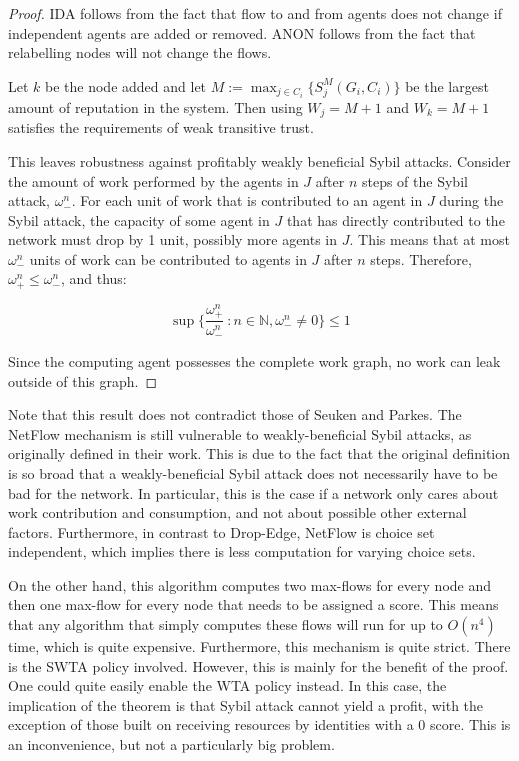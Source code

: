 \documentclass[a4paper,11pt]{book}
\newcommand{\bb}{\mathbb}
\theoremstyle{definition}
\begin{document}
\begin{proof}
    IDA follows from the fact that flow to and from agents does not change if independent agents
    are added or removed. ANON follows from the fact that relabelling nodes will not change the flows.

    Let $k$ be the node added and let 
    $M := \max_{j \in C_i}\{S^M_j(G_i, C_i)\}$ be the largest amount of reputation in the system.
    Then using $W_j = M+1$ and $W_k = M+1$ satisfies the requirements of weak transitive trust.

    This leaves robustness against profitably weakly beneficial Sybil attacks. Consider the amount of
    work performed by the agents in $J$ after $n$ steps of the Sybil attack,  $\omega^n_-$. For each
    unit of work that is contributed to an agent in $J$ during the Sybil attack, the capacity
    of some agent in $J$ that has directly contributed to the network must drop by 1 unit, possibly more
    agents in $J$. This means that at most $\omega^n_-$ units of work can be contributed to agents
    in $J$ after $n$ steps. Therefore, $\omega^n_+ \leq \omega^n_-$, and thus:

    \begin{equation*}
        \sup \{\frac{\omega^n_+}{\omega^n_-}\ : n \in \bb{N}, \omega^n_- \neq 0\} \leq 1
    \end{equation*}

    Since the computing agent possesses the complete work graph, no work can leak outside of this graph.
\end{proof}

Note that this result does not contradict those of Seuken and Parkes. The NetFlow mechanism is
still vulnerable to weakly-beneficial Sybil attacks, as originally defined in their work. 
This is due to the fact that the original definition is so broad that
a weakly-beneficial Sybil attack does not necessarily have to be bad for the network.
In particular, this is the case if a network only cares about work contribution and consumption, and
not about possible other external factors. Furthermore, in contrast to Drop-Edge, NetFlow
is choice set independent, which implies there is less computation for varying choice sets.


On the other hand, this algorithm computes two max-flows for every node and then one max-flow for
every node that needs to be assigned a score. This means that any algorithm that simply computes
these flows will run for up to $O(n^4)$ time, which is quite expensive. 
Furthermore, this mechanism is quite strict. There is the SWTA policy involved. However,
this is mainly for the benefit of the proof. One could quite easily enable the WTA policy instead.
In this case, the implication of the theorem is that Sybil attack cannot yield a profit, with the exception
of those built on receiving resources by identities with a $0$ score. This is an inconvenience,
but not a particularly big problem. 
\end{document}
